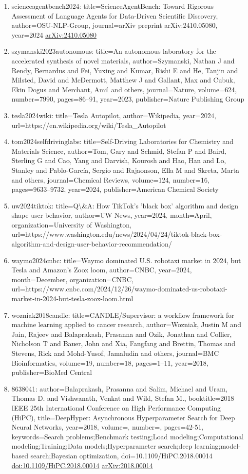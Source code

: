 \documentclass[11pt]{article}
\begin{document}
\begin{enumerate}[leftmargin=*]
  \item scienceagentbench2024: title=ScienceAgentBench: Toward Rigorous Assessment of Language Agents for Data-Driven Scientific Discovery, author=OSU-NLP-Group, journal=arXiv preprint arXiv:2410.05080, year=2024 \href{https://arxiv.org/abs/2410.05080}{arXiv:2410.05080}
  \item szymanski2023autonomous: title=An autonomous laboratory for the accelerated synthesis of novel materials, author=Szymanski, Nathan J and Rendy, Bernardus and Fei, Yuxing and Kumar, Rishi E and He, Tanjin and Milsted, David and McDermott, Matthew J and Gallant, Max and Cubuk, Ekin Dogus and Merchant, Amil and others, journal=Nature, volume=624, number=7990, pages=86--91, year=2023, publisher=Nature Publishing Group
  \item tesla2024wiki: title=Tesla Autopilot, author=Wikipedia, year=2024, url=https://en.wikipedia.org/wiki/Tesla\_Autopilot
  \item tom2024selfdrivinglabs: title=Self-Driving Laboratories for Chemistry and Materials Science, author=Tom, Gary and Schmid, Stefan P and Baird, Sterling G and Cao, Yang and Darvish, Kourosh and Hao, Han and Lo, Stanley and Pablo-García, Sergio and Rajaonson, Ella M and Skreta, Marta and others, journal=Chemical Reviews, volume=124, number=16, pages=9633--9732, year=2024, publisher=American Chemical Society
  \item uw2024tiktok: title=Q\textbackslash{}\&A: How TikTok's 'black box' algorithm and design shape user behavior, author=UW News, year=2024, month=April, organization=University of Washington, url=https://www.washington.edu/news/2024/04/24/tiktok-black-box-algorithm-and-design-user-behavior-recommendation/
  \item waymo2024cnbc: title=Waymo dominated U.S. robotaxi market in 2024, but Tesla and Amazon's Zoox loom, author=CNBC, year=2024, month=December, organization=CNBC, url=https://www.cnbc.com/2024/12/26/waymo-dominated-us-robotaxi-market-in-2024-but-tesla-zoox-loom.html
  \item wozniak2018candle: title=CANDLE/Supervisor: a workflow framework for machine learning applied to cancer research, author=Wozniak, Justin M and Jain, Rajeev and Balaprakash, Prasanna and Ozik, Jonathan and Collier, Nicholson T and Bauer, John and Xia, Fangfang and Brettin, Thomas and Stevens, Rick and Mohd-Yusof, Jamaludin and others, journal=BMC Bioinformatics, volume=19, number=18, pages=1--11, year=2018, publisher=BioMed Central
  \item 8638041: author=Balaprakash, Prasanna and Salim, Michael and Uram, Thomas D. and Vishwanath, Venkat and Wild, Stefan M., booktitle=2018 IEEE 25th International Conference on High Performance Computing (HiPC), title=DeepHyper: Asynchronous Hyperparameter Search for Deep Neural Networks, year=2018, volume=, number=, pages=42-51, keywords=Search problems;Benchmark testing;Load modeling;Computational modeling;Training;Data models;Hyperparameter search;deep learning;model-based search;Bayesian optimization, doi=10.1109/HiPC.2018.00014 \href{https://doi.org/10.1109/HiPC.2018.00014}{doi:10.1109/HiPC.2018.00014} \href{https://arxiv.org/abs/2018.00014}{arXiv:2018.00014}

\end{enumerate}
\end{document}
